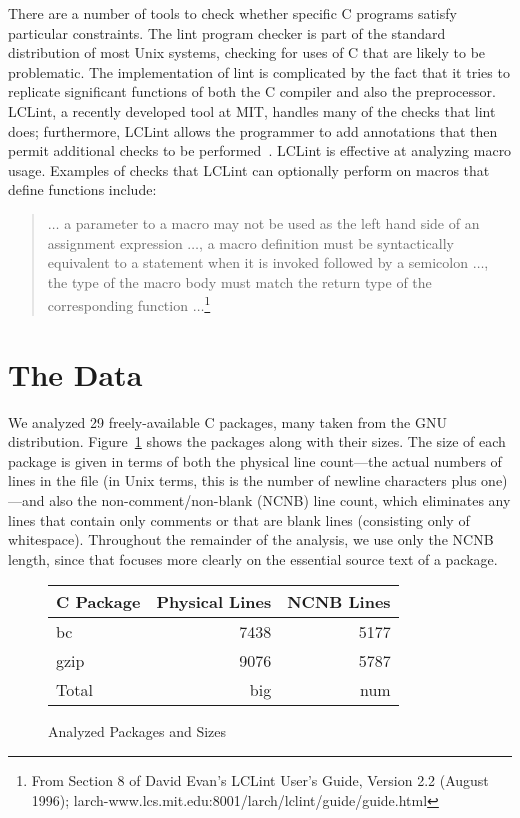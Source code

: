 There are a number of tools to check whether specific C programs
satisfy particular constraints.  The lint program checker is part of
the standard distribution of most Unix systems, checking for uses of C
that are likely to be problematic.  The implementation of lint is
complicated by the fact that it tries to replicate significant
functions of both the C compiler and also the preprocessor.  LCLint, a
recently developed tool at MIT, handles many of the checks that lint
does; furthermore, LCLint allows the programmer to add annotations
that then permit additional checks to be
performed~\cite{Evans-fse94}\cite{Evans-pldi96}.  LCLint is effective
at analyzing macro usage.  Examples of checks that LCLint can
optionally perform on macros that define functions include:
\begin{quote}
$\ldots$ a parameter to a macro may not be used as the left hand side
of an assignment expression $\ldots$, a macro definition must be
syntactically equivalent to a statement when it is invoked followed by
a semicolon $\ldots$, the type of the macro body must match the return
type of the corresponding function $\ldots$\footnote{From Section 8 of
David Evan's LCLint User's Guide, Version 2.2 (August 1996); larch-www.lcs.mit.edu:8001/larch/lclint/guide/guide.html}
\end{quote}

\section{The Data}\label{sec:gathering}

We analyzed 29 freely-available C packages, many taken from the GNU
distribution.  Figure~\ref{fig:packages} shows the packages along with
their sizes.  The size of each package is given in terms of both the
physical line count---the actual numbers of lines in the file (in Unix
terms, this is the number of newline characters plus one)---and also
the non-comment/non-blank (NCNB) line count, which eliminates any
lines that contain only comments or that are blank lines (consisting
only of whitespace).  Throughout the remainder of the analysis, we use
only the NCNB length, since that focuses more clearly on the essential
source text of a package.

\begin{figure}
\begin{tabular}{|l|r|r|}\hline
C Package & Physical Lines & NCNB Lines\\\hline\hline
bc & 7438 & 5177\\\hline
gzip & 9076 & 5787\\\hline\hline

Total & big & num\\\hline
\end{tabular}

\caption{Analyzed Packages and Sizes\label{fig:packages}}
\end{figure}

